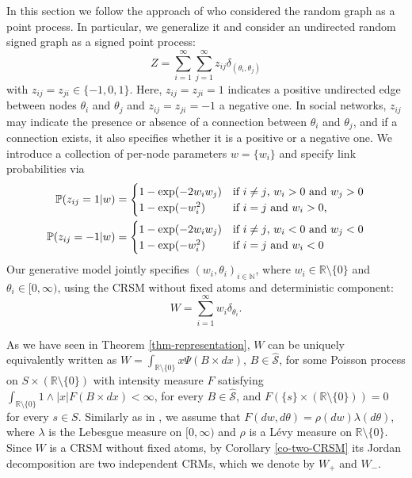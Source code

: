 \documentclass{article}
\theoremstyle{plain}
\theoremstyle{remark}
\begin{document}
In this section we follow the approach of \citet{Caron-and-Fox} who considered the random graph as a point process. In particular, we generalize it and consider an undirected random signed graph as a signed point process:
\begin{equation}\label{Z}
	Z=\sum_{i=1}^\infty\sum_{j=1}^\infty z_{ij}\delta_{(\theta_i,\theta_j)}
\end{equation}
with $z_{ij}=z_{ji}\in\{-1,0,1\}$. Here, $z_{ij}=z_{ji}=1$ indicates a positive undirected edge between nodes $\theta_i$ and $\theta_j$ and $z_{ij}=z_{ji}=-1$ a negative one. In social networks, $z_{ij}$ may indicate the presence or absence of a connection between $\theta_i$ and $\theta_j$, and if a connection exists, it also specifies whether it is a positive or a negative one.  We introduce a collection of per-node parameters $w=\{w_i\}$ and specify link probabilities via
\begin{align*}
	\mathbb{P}(z_{ij}=1|w)=\begin{cases}
		1-\exp(-2w_i w_j) & \textnormal{if $i\neq j$, $w_i>0$ and $w_j>0$}\\	1-\exp(-w_i^2) & \textnormal{if $i= j$ and $w_i>0$,}
	\end{cases}\\
	\mathbb{P}(z_{ij}=-1|w)=\begin{cases}
		1-\exp(-2w_i w_j) & \textnormal{if $i\neq j$, $w_i<0$ and $w_j<0$}\\	1-\exp(-w_i^2) & \textnormal{if $i= j$ and $w_i<0$}
	\end{cases}
\end{align*}
Our generative model jointly specifies $(w_{i},\theta_i)_{i\in\mathbb{N}}$, where $w_i\in\mathbb{R}\setminus\{0\}$ and $\theta_{i}\in[0,\infty)$, using the CRSM without fixed atoms and deterministic component:
\begin{equation*}
	W=\sum_{i=1}^{\infty}w_i\delta_{\theta_i}.
\end{equation*}

As we have seen in Theorem \ref{thm-representation}, $W$ can be uniquely equivalently written as $W=\int_{\mathbb{R}\setminus\{0\}}x\Psi(B\times dx)$, $B\in\hat{\mathcal{S}}$, for some Poisson process on $S\times(\mathbb{R}\setminus\{0\})$ with intensity measure $F$ satisfying 	$\int_{\mathbb{R}\setminus\{0\}}1\wedge|x| F(B\times dx)<\infty$, for every $B\in\hat{\mathcal{S}}$, and $F(\{s\}\times (\mathbb{R}\setminus\{0\}))=0$ for every $s\in S$. Similarly as in \citet{Caron-and-Fox}, we assume that $F(dw,d\theta)=\rho(dw)\lambda(d\theta)$, where $\lambda$ is the Lebesgue measure on $[0,\infty)$ and $\rho$ is a L\'{e}vy measure on $\mathbb{R}\setminus\{0\}$. Since $W$ is a CRSM without fixed atoms, by Corollary \ref{co-two-CRSM} its Jordan decomposition are two independent CRMs, which we denote by $W_+$ and $W_-$.
\end{document}
